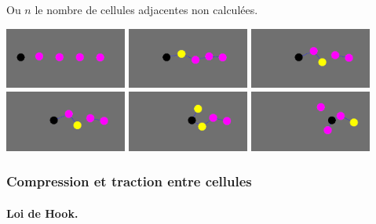 \documentclass[a4paper,11pt]{article}
\begin{document}
Ou $n$ le nombre de cellules adjacentes non calculées.

\begin{center}
  \includegraphics[width=4cm]{Images/cir_1.png}
  \includegraphics[width=4cm]{Images/cir_2.png}
  \includegraphics[width=4cm]{Images/cir_3.png}
  \includegraphics[width=4cm]{Images/cir_3.png}
  \includegraphics[width=4cm]{Images/cir_4.png}
  \includegraphics[width=4cm]{Images/cir_5.png}    
\end{center}

\subsubsection{Compression et traction entre cellules}

\paragraph{Loi de Hook.}
\end{document}

